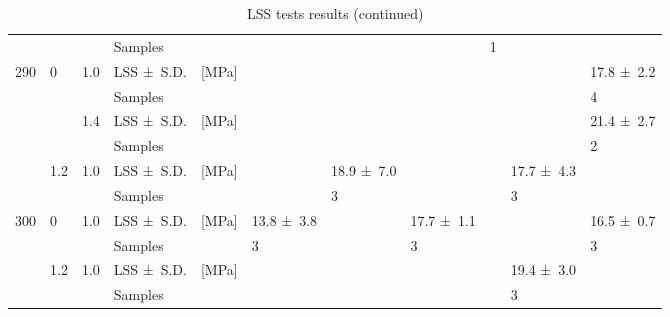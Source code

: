 \begin{table}[htb]
{\begin{tabular}{@{}lll L{1.6cm} l C{1.1cm} C{1.1cm} C{1.1cm} C{1.1cm} C{1.1cm} C{1.1cm}@{}}
			                   &          &           & Samples           &           &                   &                   &                   & 1                &                   &                   \\
			290                & 0        & 1.0       & LSS \mbox{± S.D.} & {[}MPa{]} &                   &                   &                   &                  &                   & 17.8 \mbox{± 2.2} \\
			                   &          &           & Samples           &           &                   &                   &                   &                  &                   & 4                 \\
			                   &          & 1.4       & LSS \mbox{± S.D.} & {[}MPa{]} &                   &                   &                   &                  &                   & 21.4 \mbox{± 2.7} \\
			                   &          &           & Samples           &           &                   &                   &                   &                  &                   & 2                 \\
			                   & 1.2      & 1.0       & LSS \mbox{± S.D.} & {[}MPa{]} &                   & 18.9 \mbox{± 7.0} &                   &                  & 17.7 \mbox{± 4.3} &                   \\
			                   &          &           & Samples           &           &                   & 3                 &                   &                  & 3                 &                   \\
			300                & 0        & 1.0       & LSS \mbox{± S.D.} & {[}MPa{]} & 13.8 \mbox{± 3.8} &                   & 17.7 \mbox{± 1.1} &                  &                   & 16.5 \mbox{± 0.7} \\
			                   &          &           & Samples           &           & 3                 &                   & 3                 &                  &                   & 3                 \\
			                   & 1.2      & 1.0       & LSS \mbox{± S.D.} & {[}MPa{]} &                   &                   &                   &                  & 19.4 \mbox{± 3.0} &                   \\
			                   &          &           & Samples           &           &                   &                   &                   &                  & 3                 &                   \\ \bottomrule
		\end{tabular}}
	\caption{LSS tests results (continued)}
	\label{tab:T2_table4}
\end{table}

